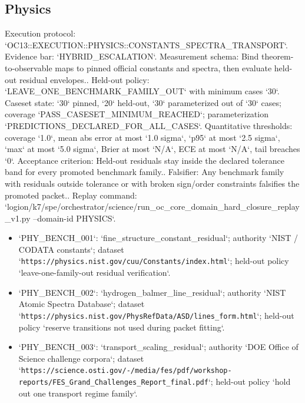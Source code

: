 \subsection{Physics}
Execution protocol: `OC13::EXECUTION::PHYSICS::CONSTANTS\_SPECTRA\_TRANSPORT`. Evidence bar: `HYBRID\_ESCALATION`.
Measurement schema: Bind theorem-to-observable maps to pinned official constants and spectra, then evaluate held-out residual envelopes..
Held-out policy: `LEAVE\_ONE\_BENCHMARK\_FAMILY\_OUT` with minimum cases `30`.
Caseset state: `30` pinned, `20` held-out, `30` parameterized out of `30` cases; coverage `PASS\_CASESET\_MINIMUM\_REACHED`; parameterization `PREDICTIONS\_DECLARED\_FOR\_ALL\_CASES`.
Quantitative thresholds: coverage `1.0`, mean abs error at most `1.0 sigma`, `p95` at most `2.5 sigma`, `max` at most `5.0 sigma`, Brier at most `N/A`, ECE at most `N/A`, tail breaches `0`.
Acceptance criterion: Held-out residuals stay inside the declared tolerance band for every promoted benchmark family..
Falsifier: Any benchmark family with residuals outside tolerance or with broken sign/order constraints falsifies the promoted packet..
Replay command: `logion/k7/spe/orchestrator/science/run\_oc\_core\_domain\_hard\_closure\_replay\_v1.py --domain-id PHYSICS`.
\begin{itemize}
\item `PHY\_BENCH\_001`: `fine\_structure\_constant\_residual`; authority `NIST / CODATA constants`; dataset `\texttt{https://physics.nist.gov/cuu/Constants/index.html}`; held-out policy `leave-one-family-out residual verification`.
\item `PHY\_BENCH\_002`: `hydrogen\_balmer\_line\_residual`; authority `NIST Atomic Spectra Database`; dataset `\texttt{https://physics.nist.gov/PhysRefData/ASD/lines\_form.html}`; held-out policy `reserve transitions not used during packet fitting`.
\item `PHY\_BENCH\_003`: `transport\_scaling\_residual`; authority `DOE Office of Science challenge corpora`; dataset `\texttt{https://science.osti.gov/-/media/fes/pdf/workshop-reports/FES\_Grand\_Challenges\_Report\_final.pdf}`; held-out policy `hold out one transport regime family`.
\end{itemize}

